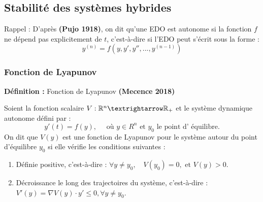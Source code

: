 \documentclass[12pt, oneside]{report} %
\newcommand{\R}{\mathbb{R}} %
\theoremstyle{definition}
\newtheorem{thm}{\textbf{Théorème}}[section]
\theoremstyle{remark}
\begin{document}
\subsection{Stabilité des systèmes hybrides}

{Rappel : }D'après \textbf{(Pujo 1918)}, on dit qu'une EDO est autonome si la fonction ${f}$ ne dépend pas explicitement de ${t}$, c'est-à-dire si l'EDO peut s'écrit sous la forme :
\begin{equation}
	y^{(n)} = {f}({y},{y}',{y}'', ... , {y}^{(n-1)})
\end{equation}

\subsubsection*{Fonction de Lyapunov}
\textbf{Définition : }Fonction de Lyapunov \textbf{(Mecence 2018)}

Soient la fonction scalaire $V: \R^n \textrightarrow \R_{+}$ et le système dynamique autonome défini par : 
\begin{equation}
	y'(t) = f(y), \quad \text{ où }  y \in R^n \text{ et } y_0\text{ le point d'\ équilibre.}
\end{equation}
On dit que $V(y)$ est une fonction de Lyapunov pour le système autour du point d'équilibre $y_0$ si elle vérifie les conditions suivantes : 
\begin{enumerate}
	\item Définie positive, c'est-à-dire : $ \forall y \neq y_0, \quad V(y_0) = 0, \text{ et } V(y) >  0.$
	\item Décroissance le long des trajectoires du système, c'est-à-dire :\\
	$ {V'}(y) = \nabla V(y)\cdot{y'} \leq 0, \forall y \neq y_0 $.
\end{enumerate}

	
%		
%	
	
\end{document}
